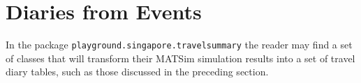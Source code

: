 \section{Diaries from Events }
In the package \texttt{playground.singapore.travelsummary} the reader may find a set of classes that will transform their MATSim simulation results into a set of travel diary tables, such as those discussed in the preceding section.





